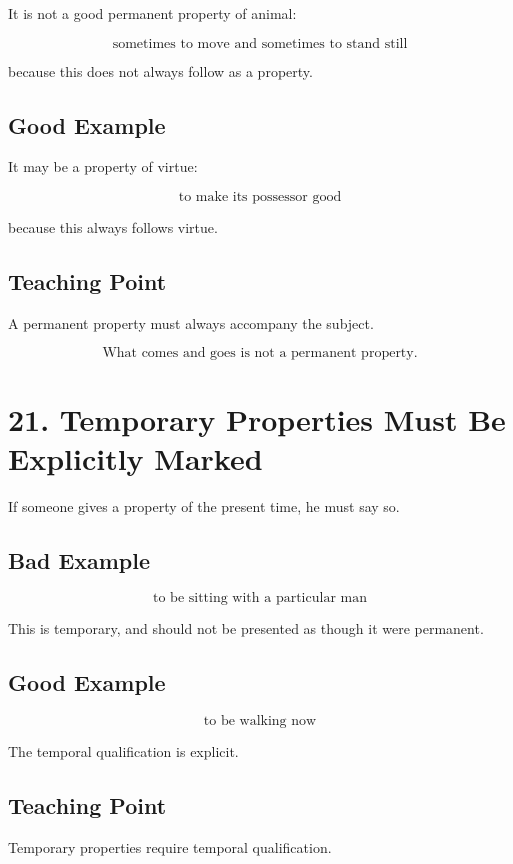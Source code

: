 \documentclass[12pt]{article}
\begin{document}
It is not a good permanent property of animal:

\[
\text{sometimes to move and sometimes to stand still}
\]

because this does not always follow as a property.

\subsection*{Good Example}

It may be a property of virtue:

\[
\text{to make its possessor good}
\]

because this always follows virtue.

\subsection*{Teaching Point}

A permanent property must always accompany the subject.

\[
\boxed{
\text{What comes and goes is not a permanent property.}
}
\]

\section*{21. Temporary Properties Must Be Explicitly Marked}

If someone gives a property of the present time, he must say so.

\subsection*{Bad Example}

\[
\text{to be sitting with a particular man}
\]

This is temporary, and should not be presented as though it were permanent.

\subsection*{Good Example}

\[
\text{to be walking now}
\]

The temporal qualification is explicit.

\subsection*{Teaching Point}

Temporary properties require temporal qualification.
\end{document}
